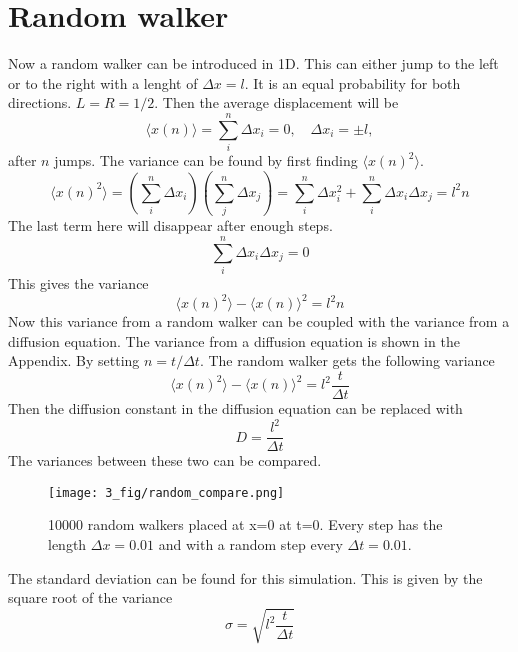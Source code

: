 \documentclass[%
twoside,                 %
final,                   %
chapterprefix=true,      %
open=right               %
10pt]{book}
\begin{document}
\section{Random walker}
Now a random walker can be introduced in 1D. This can either jump to the left or to the right with a lenght of $\Delta x = l$. It is an equal probability for both directions. $L=R=1/2$. Then the average displacement will be 
\begin{equation}
 \langle x(n) \rangle = \sum^n_i \Delta x_i = 0, \quad \Delta x_i = \pm l,
\end{equation}
after $n$ jumps. The variance can be found by first finding $\langle x(n)^2 \rangle$.
\begin{equation}
\langle x(n)^2 \rangle = \left(\sum^n_i \Delta x_i\right)\left(\sum^n_j \Delta x_j\right) = \sum^n_i \Delta x_i^2 + \sum^n_i \Delta x_i \Delta x_j = l^2n
\end{equation}
The last term here will disappear after enough steps.  
\begin{equation}
\sum^n_i \Delta x_i \Delta x_j = 0
\end{equation}
This gives the variance
\begin{equation}
\langle x(n)^2 \rangle-\langle x(n) \rangle^2 = l^2n
\end{equation}
Now this variance from a random walker can be coupled with the variance from a diffusion equation. The variance from a diffusion equation is shown in the Appendix. By setting $n = t/\Delta t$. The random walker gets the following variance
\begin{equation}
\langle x(n)^2 \rangle-\langle x(n) \rangle^2 = l^2\frac{t}{\Delta t}
\end{equation}
Then the diffusion constant in the diffusion equation can be replaced with
\begin{equation}
D = \frac{l^2}{\Delta t}
\end{equation}
The variances between these two can be compared.


\begin{figure}[ht]
  \centerline{\texttt{[image: 3\_fig/random\_compare.png]}}
  \caption{
  \label{fig:gauss_random} 10000 random walkers placed at x=0 at t=0. Every step has the length $\Delta x = 0.01$ and with a random step every $\Delta t = 0.01$.
  }
\end{figure}


The standard deviation can be found for this simulation. This is given by the square root of the variance
\begin{equation}
\sigma = \sqrt{l^2\frac{t}{\Delta t}}
\end{equation}
\end{document}
